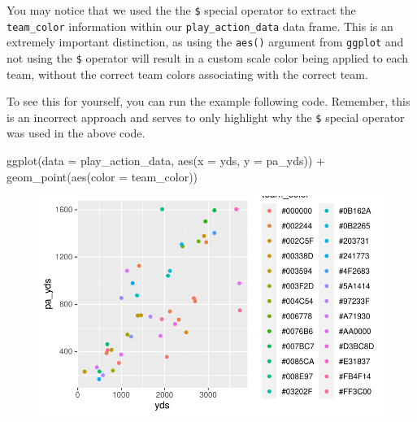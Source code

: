 \documentclass[
  letterpaper,
]{krantz}
\newenvironment{Shaded}{\begin{snugshade}}{\end{snugshade}}
\newcommand{\AttributeTok}[1]{\textcolor[rgb]{0.40,0.45,0.13}{#1}}
\newcommand{\FunctionTok}[1]{\textcolor[rgb]{0.28,0.35,0.67}{#1}}
\newcommand{\NormalTok}[1]{\textcolor[rgb]{0.00,0.23,0.31}{#1}}
\newcommand{\SpecialCharTok}[1]{\textcolor[rgb]{0.37,0.37,0.37}{#1}}
\begin{document}
\begin{tcolorbox}[enhanced jigsaw, colback=white, leftrule=.75mm, breakable, colframe=quarto-callout-important-color-frame, bottomtitle=1mm, rightrule=.15mm, left=2mm, opacityback=0, bottomrule=.15mm, arc=.35mm, coltitle=black, colbacktitle=quarto-callout-important-color!10!white, toptitle=1mm, titlerule=0mm, title=\textcolor{quarto-callout-important-color}{\faExclamation}\hspace{0.5em}{Important}, toprule=.15mm, opacitybacktitle=0.6]

You may notice that we used the the \texttt{\$} special operator to
extract the \texttt{team\_color} information within our
\texttt{play\_action\_data} data frame. This is an extremely important
distinction, as using the \texttt{aes()} argument from \texttt{ggplot}
and not using the \texttt{\$} operator will result in a custom scale
color being applied to each team, without the correct team colors
associating with the correct team.

To see this for yourself, you can run the example following code.
Remember, this is an incorrect approach and serves to only highlight why
the \texttt{\$} special operator was used in the above code.

\begin{Shaded}
\begin{Highlighting}[]
\FunctionTok{ggplot}\NormalTok{(}\AttributeTok{data =}\NormalTok{ play\_action\_data, }\FunctionTok{aes}\NormalTok{(}\AttributeTok{x =}\NormalTok{ yds, }\AttributeTok{y =}\NormalTok{ pa\_yds)) }\SpecialCharTok{+}
  \FunctionTok{geom\_point}\NormalTok{(}\FunctionTok{aes}\NormalTok{(}\AttributeTok{color =}\NormalTok{ team\_color))}
\end{Highlighting}
\end{Shaded}

\begin{figure}[H]

{\centering \includegraphics{04-nfl-analytics-visualization_files/figure-pdf/incorrect-use-of-aes-1.pdf}

}

\end{figure}

\end{tcolorbox}
\end{document}
